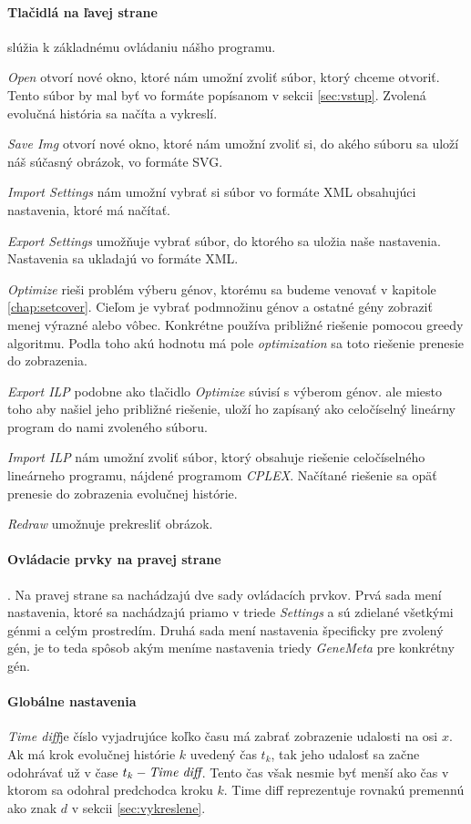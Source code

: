 \paragraph{Tlačidlá na ľavej strane} slúžia k základnému ovládaniu nášho programu.

\emph{Open} otvorí nové okno, ktoré nám umožní zvoliť súbor, ktorý chceme otvoriť. Tento súbor by mal byť vo formáte popísanom v sekcii \ref{sec:vstup}. 
 Zvolená evolučná história sa načíta a vykreslí. 
 
\emph{Save Img} otvorí nové okno, ktoré nám umožní zvoliť si, do akého súboru sa uloží náš súčasný obrázok, vo formáte SVG.

\emph{Import Settings}  nám umožní vybrať si súbor vo formáte XML obsahujúci nastavenia, ktoré má načítať.

\emph{Export Settings} umožňuje vybrať súbor, do ktorého sa uložia naše nastavenia. Nastavenia sa ukladajú vo formáte XML.

\emph{Optimize} rieši problém výberu génov, ktorému sa budeme venovať v kapitole \ref{chap:setcover}.
Cieľom je vybrať podmnožinu génov a ostatné gény zobraziť menej výrazné alebo vôbec.
Konkrétne používa približné riešenie pomocou greedy algoritmu.
Podla toho akú hodnotu má pole \emph{optimization} sa toto riešenie prenesie do zobrazenia.

\emph{Export ILP} podobne ako tlačidlo \emph{Optimize} súvisí s výberom génov.
ale miesto toho aby našiel jeho približné riešenie, uloží ho zapísaný ako celočíselný
lineárny program do nami zvoleného súboru.

\emph{Import ILP} nám umožní zvoliť súbor, ktorý obsahuje riešenie celočíselného lineárneho programu, nájdené programom \emph{CPLEX}.
Načítané riešenie sa opäť prenesie do zobrazenia evolučnej histórie.
 
\emph{Redraw} umožnuje prekresliť obrázok.
\paragraph{Ovládacie prvky na pravej strane}.
Na pravej strane sa nachádzajú dve sady ovládacích prvkov. Prvá sada mení nastavenia, ktoré sa 
nachádzajú priamo v triede \emph{Settings} a sú zdielané všetkými génmi a celým prostredím.
Druhá sada mení nastavenia špecificky pre zvolený gén, je to teda spôsob akým meníme nastavenia triedy
\emph{GeneMeta} pre konkrétny gén.
\paragraph{Globálne nastavenia}\mbox{}\linebreak
\emph{Time diff}je číslo vyjadrujúce koľko času má zabrať zobrazenie udalosti na osi $x$. 
Ak má krok evolučnej histórie $k$ uvedený čas $t_k$, tak 
jeho udalosť sa začne odohrávať už v čase $t_k - \emph{Time diff}$. Tento čas však nesmie byť menší ako čas
v ktorom sa odohral predchodca kroku $k$. Time diff reprezentuje rovnakú premennú ako znak $d$ v sekcii 
\ref{sec:vykreslene}. 

